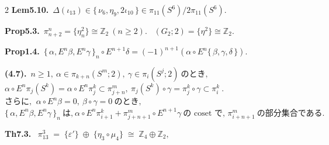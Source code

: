 \documentclass[10pt, leqno]{ltjsarticle}
\newcommand{\toda}[1]{\{\,#1\,\}}              %
\newcommand{\todai}[2][]{\{\,#2\,\}_{#1}}      %
\newcommand{\gen}[1]{\{#1\}}       %
\newcommand{\pis}[2]{\pi_{#1}(#2)}       %
\newcommand{\pit}[2]{\pi_{#1}^{#2}}
\numberwithin{equation}{section}
\theoremstyle{plain}
\theoremstyle{definition}
\theoremstyle{remark}
\begin{document}
\begin{paracol}{2}
\noindent
\textbf{Lem5.10.}\
\(
\Delta(\iota_{13})\in\toda{\nu_6,\eta_9,2\iota_{10}}\in\pi_{11}(S^6)/2\pi_{11}(S^6) .
\)

\noindent
\textbf{Prop5.3.}\
\(\pi^{n}_{n+2}=\gen{\eta_n^{2}}\cong \mathbb Z_2\ (n\ge2).\) \
\((G_2;2)=\gen{\eta^{2}}\cong \mathbb Z_2 .\)

\noindent
\textbf{Prop1.4.}\
\(\todai[n]{\alpha, E^n\beta, E^n\gamma}\circ E^{n+1}\delta
= (-1)^{n+1}(\alpha\circ E^n\toda{\beta, \gamma, \delta})\).

\noindent
\textbf{(4.7).}\
\(n\ge1, \ \alpha\in\pis{k+n}{S^m; 2},\ \gamma\in\pis{i}{S^j; 2}
\ \text{のとき, }\)\\
\(\alpha\circ E^n\pis{j}{S^k} = \alpha\circ E^n \pit{j}{k}
\subset \pit{j+n}{m},
\ \pis{j}{S^k}\circ\gamma = \pit{j}{k}\circ\gamma \subset\pit{i}{k}\ . \)\\
\(\text{さらに, }\ \alpha\circ E^n\beta=0,\ \beta\circ\gamma = 0 \ \text{のとき, }\)\\
\(\todai[n]{\alpha, E^n\beta, E^n\gamma}\ \text{は,}\
\alpha\circ E^n\pit{i+1}{k} + \pit{j+n+1}{m}\circ E^{n+1}\gamma\
\text{の coset で, }\pit{i+n+1}{m} \ \text{の部分集合である. }\)

\noindent
\textbf{Th7.3.}\
\(\pit{13}{3} \;=\; \gen{\varepsilon'} \;\oplus\; \gen{\eta_{3}\circ \mu_{4}}
  \;\cong\; \mathbb Z_{4}\oplus\mathbb Z_{2},\)


\end{paracol}
\end{document}
